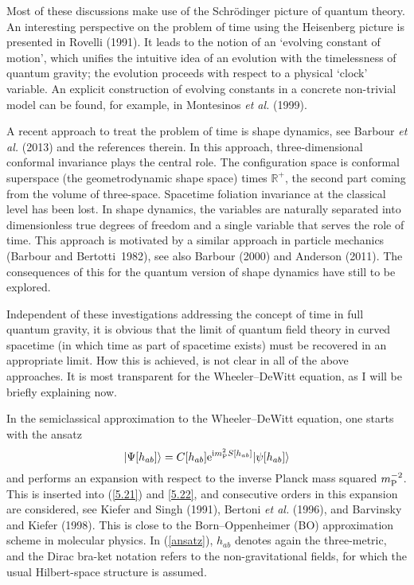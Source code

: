 \documentclass[12pt,a4paper]{article}
\newcommand{\be}{\begin{equation}}
\newcommand{\ee}{\end{equation}}
\newcommand{\lb}{\label}
\newcommand{\E}{{\rm e}}
\newcommand{\I}{{\rm i}}
\begin{document}
Most of these discussions make use of the Schr\"odinger picture of
quantum theory. An interesting perspective on the problem of time
using the Heisenberg picture is presented in Rovelli (1991). It leads
to the notion of an `evolving constant of motion', which unifies the
intuitive idea of an evolution with the timelessness of quantum
gravity; the evolution proceeds with respect to a physical `clock'
variable. An explicit construction of evolving constants in a concrete
non-trivial model can be found, for example, in Montesinos {\em et
  al.} (1999).

A recent approach to treat the problem of time is shape dynamics, see
Barbour {\em et al.} (2013) and the references therein. In this
approach, three-dimensional conformal invariance plays the central
role. The configuration space is conformal superspace (the
geometrodynamic shape space) times ${\mathbb R}^+$, the second part
coming from the volume of three-space. Spacetime foliation invariance
at the classical level has been lost. In shape dynamics, the variables
are naturally separated into dimensionless true degrees of freedom and
a single variable that serves the role of time. This approach is
motivated by a similar approach in particle mechanics (Barbour and
Bertotti~1982), see also Barbour (2000) and Anderson (2011). The
consequences of this for the quantum version of 
shape dynamics have still to be explored. 

Independent of these investigations addressing the concept of time
in full quantum gravity, it is obvious that the limit of quantum field
theory in curved spacetime (in which time as part of spacetime exists)
must be recovered in an appropriate limit. How this is achieved, is
not clear in all of the above approaches. It is most transparent for
the Wheeler--DeWitt equation, as I will be briefly explaining now.

In the semiclassical approximation to the Wheeler--DeWitt equation,
one starts with the ansatz
\be
\lb{ansatz}
        \vert\Psi[h_{ab}]\rangle=C[h_{ab}]
        \E^{\I m_{\rm P}^2S[h_{ab}]}|\psi [h_{ab}]\rangle
\ee
and performs an expansion with respect to the inverse Planck mass squared
$m_{\rm P}^{-2}$. This is inserted into (\ref{5.21}) and \eqref{5.22},
and consecutive 
orders in this expansion are considered, see Kiefer and Singh (1991),
Bertoni {\em et al.} (1996),
and Barvinsky and Kiefer (1998). This is 
close to the Born--Oppenheimer (BO) approximation scheme in
molecular physics. 
In (\ref{ansatz}), $h_{ab}$ denotes again the three-metric, and the Dirac
bra-ket notation refers to the non-gravitational fields, for which the
usual Hilbert-space structure is assumed.
\end{document}
